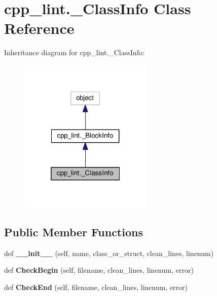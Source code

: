 \hypertarget{classcpp__lint_1_1___class_info}{}\section{cpp\+\_\+lint.\+\_\+\+Class\+Info Class Reference}
\label{classcpp__lint_1_1___class_info}


Inheritance diagram for cpp\+\_\+lint.\+\_\+\+Class\+Info\+:
\nopagebreak
\begin{figure}[H]
\begin{center}
\leavevmode
\includegraphics[width=181pt]{classcpp__lint_1_1___class_info__inherit__graph}
\end{center}
\end{figure}
\subsection*{Public Member Functions}
\begin{DoxyCompactItemize}
\item 
\mbox{\label{classcpp__lint_1_1___class_info_a3a86d1cdcd8aaa0982eed4cf13c9c28d}} 
def {\bfseries \+\_\+\+\_\+init\+\_\+\+\_\+} (self, name, class\+\_\+or\+\_\+struct, clean\+\_\+lines, linenum)
\item 
\mbox{\label{classcpp__lint_1_1___class_info_ad748d31bf6595361fecd49e403f10e60}} 
def {\bfseries Check\+Begin} (self, filename, clean\+\_\+lines, linenum, error)
\item 
\mbox{\label{classcpp__lint_1_1___class_info_adde5a40721a72539b6dc1b32bc3e3d6f}} 
def {\bfseries Check\+End} (self, filename, clean\+\_\+lines, linenum, error)
\end{DoxyCompactItemize}

